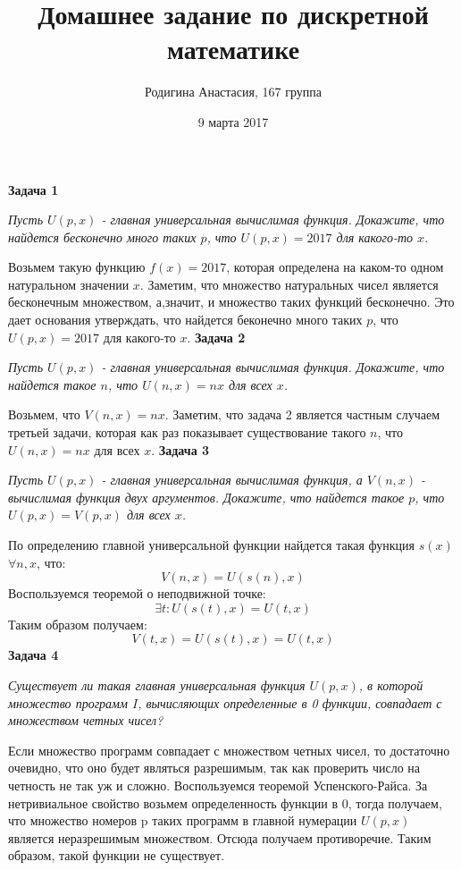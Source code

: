 \documentclass{article}
\title{Домашнее задание по дискретной математике}
\author{Родигина Анастасия, 167 группа}
\date{9 марта  2017}
\begin{document}
            

\maketitle  
 \noindent \textbf{Задача 1}
\begin{center} 
\textit{Пусть $U(p,x)$ - главная универсальная вычислимая функция. Докажите, что найдется бесконечно много таких $p$, что $U(p,x)=2017$ для какого-то $x$.}
\end{center}
Возьмем такую функцию $f(x)=2017$, которая определена на каком-то одном натуральном значении $x$. Заметим, что множество натуральных чисел является бесконечным множеством, а,значит, и множество таких функций бесконечно. Это дает основания утверждать, что найдется беконечно много таких $p$, что $U(p,x)=2017$ для какого-то $x$.
\newline
\newline
\textbf{Задача 2}
\begin{center}
\textit{Пусть $U(p,x)$ - главная универсальная вычислимая функция. Докажите, что найдется такое $n$, что $U(n,x)=nx$ для всех $x$.}
\end{center}
 Возьмем, что $V(n,x)=nx$. Заметим, что задача 2 является частным случаем третьей задачи, которая как раз показывает существование такого $n$, что $U(n,x)=nx$ для всех $x$.
 \newline
 \newline
\textbf{Задача 3}
\begin{center}
\textit{Пусть $U(p,x)$ - главная универсальная вычислимая функция, а $V(n,x)$ - вычислимая функция двух аргументов. Докажите, что найдется такое $p$, что $U(p,x)=V(p,x)$ для всех $x$.} 
\end{center}
По определению главной универсальной функции найдется такая функция $s(x)$ $\forall n,x$, что:
$$V(n,x)=U(s(n),x)$$
Воспользуемся теоремой о неподвижной точке:
$$\exists t : U(s(t),x)=U(t,x)$$
Таким образом получаем:
$$V(t,x)=U(s(t),x)=U(t,x)$$
\newline
\newline
 \noindent \textbf{Задача 4}
\begin{center}
\textit{Существует ли такая главная универсальная функция $U(p,x)$, в которой множество программ $I$, вычисляющих определенные в 0 функции, совпадает с множеством четных чисел?}
\end{center}
 Если множество программ совпадает с множеством четных чисел, то достаточно очевидно, что оно будет являться разрешимым, так как проверить число на четность не так уж и сложно. Воспользуемся теоремой Успенского-Райса. За нетривиальное свойство возьмем определенность функции в 0, тогда получаем, что множество номеров p таких программ в главной нумерации $U(p,x)$ является неразрешимым множеством. Отсюда получаем противоречие. Таким образом, такой функции не существует.
\end{document}
